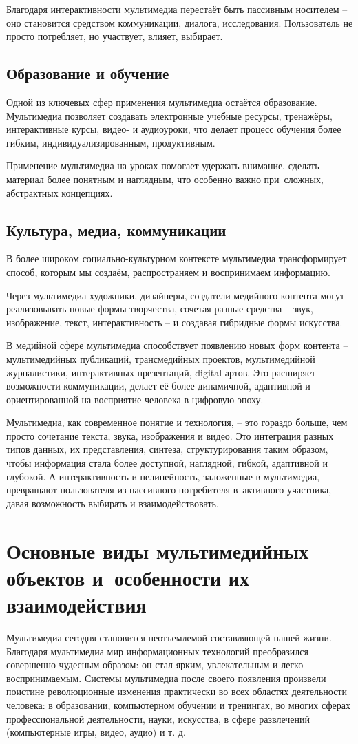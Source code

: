 \documentclass{ou}
\begin{document}
Благодаря интерактивности мультимедиа перестаёт быть пассивным носителем -- оно становится средством коммуникации, диалога, исследования. Пользователь не просто потребляет, но участвует, влияет, выбирает.
\subsection{Образование и обучение}
Одной из ключевых сфер применения мультимедиа остаётся образование. Мультимедиа позволяет создавать электронные учебные ресурсы, тренажёры, интерактивные курсы, видео- и аудиоуроки, что делает процесс обучения более гибким, индивидуализированным, продуктивным. 

Применение мультимедиа на уроках помогает удержать внимание, сделать материал более понятным и наглядным, что особенно важно при~сложных, абстрактных концепциях. 
\subsection{Культура, медиа, коммуникации}
В более широком социально-культурном контексте мультимедиа трансформирует способ, которым мы создаём, распространяем и воспринимаем информацию. 

Через мультимедиа художники, дизайнеры, создатели медийного контента могут реализовывать новые формы творчества, сочетая разные средства -- звук, изображение, текст, интерактивность -- и создавая гибридные формы искусства. 

В медийной сфере мультимедиа способствует появлению новых форм контента -- мультимедийных публикаций, трансмедийных проектов, мультимедийной журналистики, интерактивных презентаций, digital-артов. Это расширяет возможности коммуникации, делает её более динамичной, адаптивной и ориентированной на восприятие человека в цифровую эпоху. 

Мультимедиа, как современное понятие и технология, -- это гораздо больше, чем просто сочетание текста, звука, изображения и видео. Это интеграция разных типов данных, их представления, синтеза, структурирования таким образом, чтобы информация стала более доступной, наглядной, гибкой, адаптивной и глубокой. А интерактивность и нелинейность, заложенные в мультимедиа, превращают пользователя из пассивного потребителя в~активного участника, давая возможность выбирать и взаимодействовать.
\newpage
\section{Основные виды мультимедийных объектов и~особенности их взаимодействия}
Мультимедиа сегодня становится неотъемлемой составляющей нашей жизни. Благодаря мультимедиа мир информационных технологий преобразился совершенно чудесным образом: он стал ярким, увлекательным и легко воспринимаемым. Системы мультимедиа после своего появления произвели поистине революционные изменения практически во всех областях деятельности человека: в образовании, компьютерном обучении и тренингах, во многих сферах профессиональной деятельности, науки, искусства, в сфере развлечений (компьютерные игры, видео, аудио) и т. д\cite{LPGenerator}.
\end{document}
